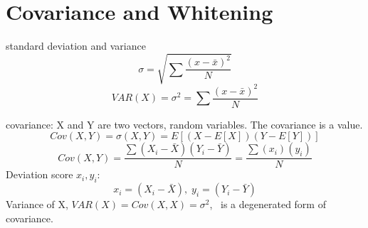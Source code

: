 \section{Covariance and Whitening}
\begin{compactitem}
 
\item {standard deviation and variance}
\begin{equation}
\label{eq:std}
\sigma = \sqrt {\sum \frac{(x-\bar{x})^2}{N}}
\end{equation}
\begin{equation}
\label{eq:variance}
VAR(X)=\sigma^{2} = {\sum \frac{(x-\bar{x})^2}{N}}
\end{equation}

\item covariance: X and Y are two vectors, random variables. The covariance is a value.
\begin{equation}
\label{eq:covar}
Cov(X,Y)=\sigma(X,Y)=E[(X - E[X])(Y-E[Y])]
\end{equation}
\begin{equation}
\label{eq:covar1}
Cov(X,Y)=\frac{\sum(X_i-\bar{X})(Y_i-\bar{Y})}{N}=
\frac{\sum(x_i)(y_i)}{N}
\end{equation}
Deviation score $x_i, y_i$:
\begin{equation}
\label{eq:covar1}
x_{i}=(X_i-\bar{X}),\;
y_{i}=(Y_i-\bar{Y})
\end{equation}
Variance of X, $VAR(X)=Cov(X,X)=\sigma^{2}$, \ is a degenerated form of covariance.\\


\end{compactitem}
